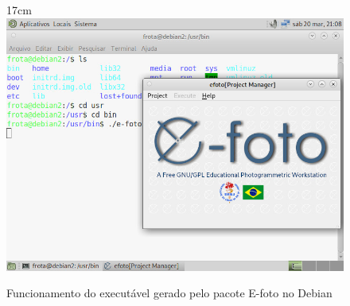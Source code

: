 \begin{figure}[!ht]{17cm}
	\centering
	\includegraphics[width=15cm]{Figuras/debian_exec.jpg}
	\caption{Funcionamento do executável gerado pelo pacote E-foto no Debian} \label{fig:debian_exec}
\end{figure}